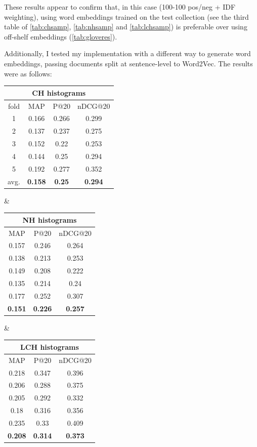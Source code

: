 These results appear to confirm that, in this case (100-100 pos/neg + IDF weighting), using word embeddings trained on the test collection (see the third table of \ref{tab:chsamp}, \ref{tab:nhsamp} and \ref{tab:lchsamp}) is preferable over using off-shelf embeddings (\ref{tab:gloveres}).

Additionally, I tested my implementation with a different way to generate word embeddings, passing documents split at sentence-level to Word2Vec. The results were as follows:

\begin{adjustbox}{center, tabular=ccc, caption={DRMM runs, 100-100 pos/neg IDF weighting, stemmed with stopwords removal, second version of word embeddings}, nofloat=table}
\centering
\begin{tabular}{c|ccc}
\hline
\multicolumn{4}{c}{CH histograms} \\ \hline
fold & MAP & P@20 & nDCG@20 \\ \hline
1 & 0.166 & 0.266 & 0.299 \\
2 & 0.137 & 0.237 & 0.275 \\
3 & 0.152 & 0.22 & 0.253 \\
4 & 0.144 & 0.25 & 0.294 \\
5 & 0.192 & 0.277 & 0.352 \\ \hline
avg. & \textbf{0.158} & \textbf{0.25} & \textbf{0.294} \\
\hline
\end{tabular} &
\begin{tabular}{ccc}
\hline
\multicolumn{3}{c}{NH histograms} \\ \hline
MAP & P@20 & nDCG@20 \\ \hline
0.157 & 0.246 & 0.264 \\
0.138 & 0.213 & 0.253 \\
0.149 & 0.208 & 0.222 \\
0.135 & 0.214 & 0.24 \\
0.177 & 0.252 & 0.307 \\ \hline
\textbf{0.151} & \textbf{0.226} & \textbf{0.257} \\
\hline
\end{tabular} &
\begin{tabular}{ccc}
\hline
\multicolumn{3}{c}{LCH histograms} \\ \hline
MAP & P@20 & nDCG@20 \\ \hline
0.218 & 0.347 & 0.396 \\
0.206 & 0.288 & 0.375 \\
0.205 & 0.292 & 0.332\\
0.18 & 0.316 & 0.356 \\
0.235 & 0.33 & 0.409 \\ \hline
\textbf{0.208} & \textbf{0.314} & \textbf{0.373} \\
\hline
\end{tabular}
\label{tab:sentw2v}
\end{adjustbox}


